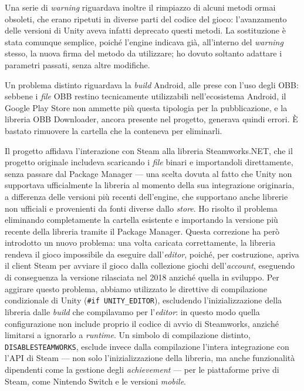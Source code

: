 Una serie di \textit{warning} riguardava inoltre il rimpiazzo di alcuni metodi ormai obsoleti, che erano ripetuti in diverse parti del codice del gioco: l'avanzamento delle versioni di Unity aveva infatti deprecato questi metodi. La sostituzione è stata comunque semplice, poiché l'engine indicava già, all'interno del \textit{warning} stesso, la nuova firma del metodo da utilizzare; ho dovuto soltanto adattare i parametri passati, senza altre modifiche.
 
Un problema distinto riguardava la \textit{build} Android, alle prese con l'uso degli OBB: sebbene i \textit{file} OBB restino tecnicamente utilizzabili nell'ecosistema Android, il Google Play Store non ammette più questa tipologia per la pubblicazione, e la libreria OBB Downloader, ancora presente nel progetto, generava quindi errori. È bastato rimuovere la cartella che la conteneva per eliminarli.
 
Il progetto affidava l'interazione con Steam alla libreria Steamworks.NET, che il progetto originale includeva scaricando i \textit{file} binari e importandoli direttamente, senza passare dal Package Manager — una scelta dovuta al fatto che Unity non supportava ufficialmente la libreria al momento della sua integrazione originaria, a differenza delle versioni più recenti dell'engine, che supportano anche librerie non ufficiali e provenienti da fonti diverse dallo \textit{store}. Ho risolto il problema eliminando completamente la cartella esistente e importando la versione più recente della libreria tramite il Package Manager. Questa correzione ha però introdotto un nuovo problema: una volta caricata correttamente, la libreria rendeva il gioco impossibile da eseguire dall'\textit{editor}, poiché, per costruzione, apriva il client Steam per avviare il gioco dalla collezione giochi dell'\textit{account}, eseguendo di conseguenza la versione rilasciata nel 2018 anziché quella in sviluppo. Per aggirare questo problema, abbiamo utilizzato le direttive di compilazione condizionale di Unity (\texttt{\#if UNITY\_EDITOR}), escludendo l'inizializzazione della libreria dalle \textit{build} che compilavamo per l'\textit{editor}: in questo modo quella configurazione non include proprio il codice di avvio di Steamworks, anziché limitarsi a ignorarlo a \textit{runtime}. Un simbolo di compilazione distinto, \texttt{DISABLESTEAMWORKS}, esclude invece dalla compilazione l'intera integrazione con l'API di Steam — non solo l'inizializzazione della libreria, ma anche funzionalità dipendenti come la gestione degli \textit{achievement} — per le piattaforme prive di Steam, come Nintendo Switch e le versioni \textit{mobile}.
 
